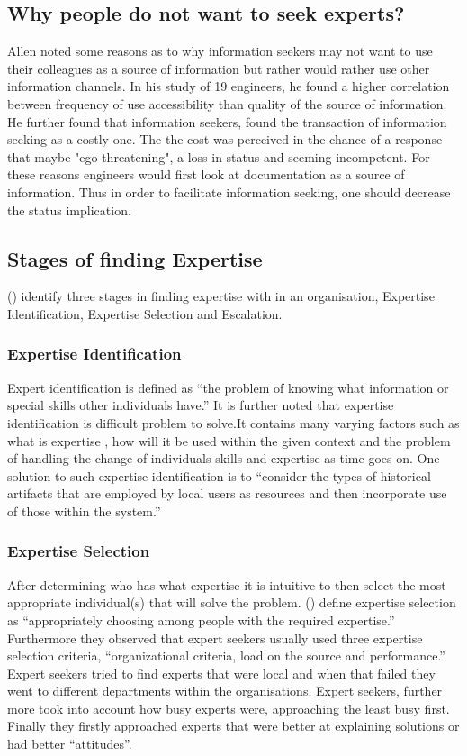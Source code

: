 \documentclass[a4paper,oneside,11pt]{report}
\begin{document}
\subsection{Why people do not want to seek experts?}
Allen noted some reasons as to why information seekers may not want to use their colleagues as a source of information but rather would rather use other information channels. In his study of 19 engineers, he found a higher correlation between frequency of use accessibility than quality of the source of information. He further found that information seekers, found the transaction of information seeking as a costly one. The the cost was perceived in the chance of a response that maybe "ego threatening", a loss in status and seeming incompetent. For these reasons engineers would first look at documentation as a source of information. Thus in order to facilitate information seeking, one should decrease the status implication.

\subsection{Stages of finding Expertise}
\citeauthor{mcdonalackerman1998}(\citeyear{mcdonalackerman1998}) identify three stages in finding expertise with in an organisation, Expertise Identification, Expertise Selection and Escalation.  
\subsubsection{Expertise Identification} 
Expert identification is defined as \enquote {the problem of knowing what information or special skills other individuals have.} It is further noted that expertise identification is difficult problem to solve.It contains many varying factors such as what is expertise , how will it be used within the given context and the problem of handling the change of individuals skills and expertise as time goes on. One solution to such expertise identification is to \enquote {consider the types of historical artifacts that are employed by local users as resources and then incorporate use of those within the system.}\autocite{mcdonalackerman1998}
\subsubsection{Expertise Selection} 
After determining who has what expertise it is intuitive to then select the most appropriate individual(s) that will solve the problem. \citeauthor{mcdonalackerman1998} (\citeyear{mcdonalackerman1998}) define expertise selection as \enquote {appropriately choosing among people with the required expertise.} Furthermore they observed that expert seekers usually used three expertise selection criteria, \enquote {organizational criteria, load on the source and performance.} Expert seekers tried to find experts that were local and when that failed they went to different departments within the organisations. Expert seekers, further more took into account how busy experts were, approaching the least busy first. Finally they firstly approached experts that were better at explaining solutions or had better \enquote {attitudes}.
\end{document}

